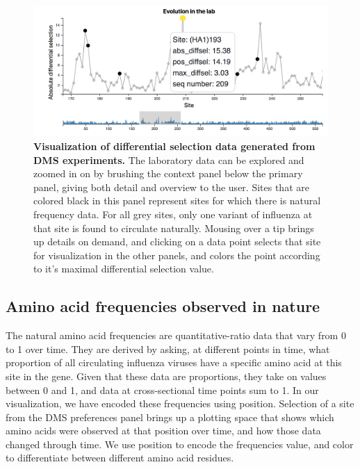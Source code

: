 \documentclass[sigchi]{acmart}
\begin{document}
\begin{figure}[H]
	\includegraphics[width=1.0\textwidth]{dms-brushed-tooltip.png}
	\caption{\textbf{Visualization of differential selection data generated from DMS experiments.}
  The laboratory data can be explored and zoomed in on by brushing the context panel below the primary panel, giving both detail and overview to the user. Sites that are colored black in this panel represent sites for which there is natural frequency data. For all grey sites, only one variant of influenza at that site is found to circulate naturally. Mousing over a tip brings up details on demand, and clicking on a data point selects that site for visualization in the other panels, and colors the point according to it's maximal differential selection value.
	}
	\label{dms-data}
\end{figure}

\subsection{Amino acid frequencies observed in nature}
The natural amino acid frequencies are quantitative-ratio data that vary from 0 to 1 over time. They are derived by asking, at different points in time, what proportion of all circulating influenza viruses have a specific amino acid at this site in the gene. Given that these data are proportions, they take on values between 0 and 1, and data at cross-sectional time points sum to 1. In our visualization, we have encoded these frequencies using position. Selection of a site from the DMS preferences panel brings up a plotting space that shows which amino acids were observed at that position over time, and how those data changed through time. We use position to encode the frequencies value, and color to differentiate between different amino acid residues.
\end{document}
